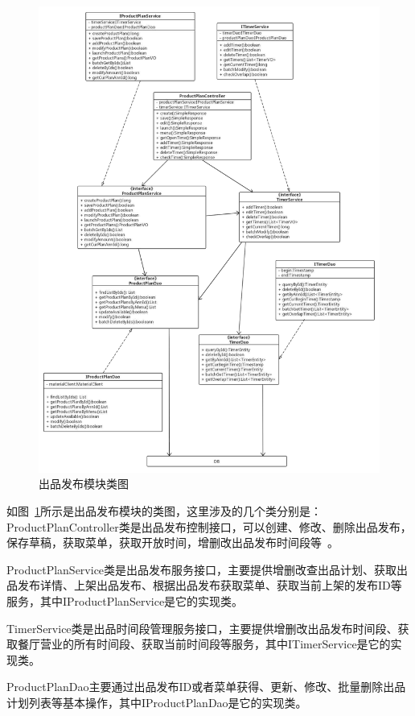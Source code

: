 \begin{figure}[htbp!]
    \centering
    \includegraphics[width=\linewidth]{FIGs/chapter4/dish.pdf}
    \caption{出品发布模块类图}\label{fig_dish}
\end{figure}

如图~\ref{fig_dish}所示是出品发布模块的类图，这里涉及的几个类分别是：ProductPlanController类是出品发布控制接口，可以创建、修改、删除出品发布，保存草稿，获取菜单，获取开放时间，增删改出品发布时间段等~\cite{abf}。

ProductPlanService类是出品发布服务接口，主要提供增删改查出品计划、获取出品发布详情、上架出品发布、根据出品发布获取菜单、获取当前上架的发布ID等服务，其中IProductPlanService是它的实现类。

TimerService类是出品时间段管理服务接口，主要提供增删改出品发布时间段、获取餐厅营业的所有时间段、获取当前时间段等服务，其中ITimerService是它的实现类。

ProductPlanDao主要通过出品发布ID或者菜单获得、更新、修改、批量删除出品计划列表等基本操作，其中IProductPlanDao是它的实现类。

